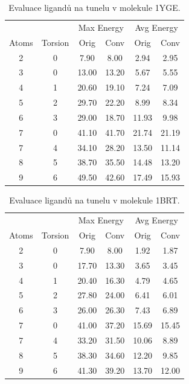 \begin{table}[htbp]
    \centering
    \begin{tabular}{cccccc}
    \toprule
        & & \multicolumn{2}{c}{Max Energy} & \multicolumn{2}{c}{Avg Energy} \\
        Atoms & Torsion & Orig & Conv & Orig & Conv \\
        \midrule
            2 & 0 & 7.90  &8.00 & 2.94 & 2.95 \\
            3 & 0 & 13.00 & 13.20 & 5.67 & 5.55 \\
            4 & 1 & 20.60 & 19.10 & 7.24 & 7.09 \\
            5 & 2 & 29.70 & 22.20 & 8.99 & 8.34 \\
            6 & 3 & 29.00 & 18.70 & 11.93 & 9.98 \\
            7 & 0 & 41.10 & 41.70 & 21.74 & 21.19 \\
            7 & 4 & 34.10 & 28.20 & 13.50 & 11.14 \\
            8 & 5 & 38.70 & 35.50 & 14.48 & 13.20 \\
            9 & 6 & 49.50 & 42.60 & 17.49 & 15.93 \\
        \bottomrule
    \end{tabular}
    \caption{Evaluace ligandů na tunelu v molekule 1YGE.}
\end{table}

\begin{table}[htbp]
    \centering
    \begin{tabular}{cccccc}
    \toprule
        & & \multicolumn{2}{c}{Max Energy} & \multicolumn{2}{c}{Avg Energy} \\
        Atoms & Torsion & Orig & Conv & Orig & Conv \\
        \midrule
            2 & 0 & 7.90 & 8.00 & 1.92 & 1.87 \\
            3 & 0 & 17.70 & 13.30 & 3.65 & 3.45 \\
            4 & 1 & 20.40 & 16.30 & 4.79 & 4.65 \\
            5 & 2 & 27.80 & 24.00 & 6.41 & 6.01 \\
            6 & 3 & 26.00 & 26.30 & 7.43 & 6.89 \\
            7 & 0 & 41.00 & 37.20 & 15.69 & 15.45 \\
            7 & 4 & 33.20 & 31.50 & 10.06 & 8.89 \\
            8 & 5 & 38.30 & 34.60 & 12.20 & 9.85 \\
            9 & 6 & 41.30 & 39.20 & 13.70 & 12.00 \\
        \bottomrule
    \end{tabular}
    \caption{Evaluace ligandů na tunelu v molekule 1BRT.}
\end{table}

